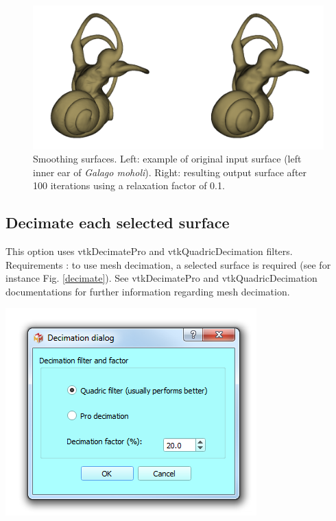\begin{figure}
  \centering
  \includegraphics[scale=0.35]{images/09/structure/surface_smoothing_example.png} 
	\caption{Smoothing surfaces. Left: example of original input surface (left inner ear of \textit{Galago moholi}). Right: resulting output surface after 100 iterations using a relaxation factor of 0.1.}
\label{smooth}
 
\end{figure}





\subsection{Decimate each selected surface}
\noindent
\begin{minipage}{0.5\textwidth}


This option uses vtkDecimatePro and vtkQuadricDecimation filters. Requirements : to use mesh decimation, a selected
surface is required (see for instance Fig. \ref{decimate}). See vtkDecimatePro and vtkQuadricDecimation documentations for further information regarding
mesh decimation.

\end{minipage}    
\begin{minipage}{0.5\textwidth}\centering
  \includegraphics[scale=0.5]{images/09/structure/decimation_dialog.png}
 \end{minipage} 
\noindent

